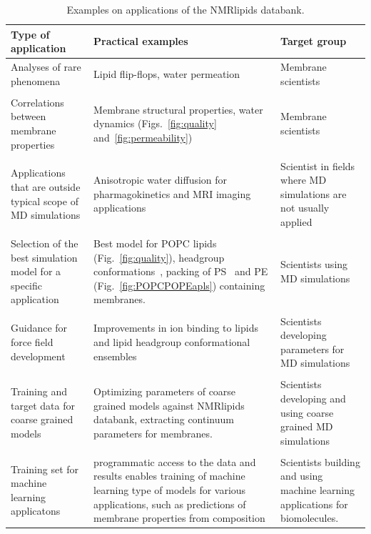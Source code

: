 \documentclass[fleqn,10pt]{wlscirep}
\begin{document}
\begin{table}[t]
    \centering
    \begin{tabular}{p{5.0cm}  p{5.0cm}  p{4.0cm}}
    Type of application     & Practical examples & Target group \\
    \hline
    Analyses of rare phenomena               & Lipid flip-flops, water permeation & Membrane scientists \\
    \\
    Correlations between membrane properties & 
    Membrane structural properties, water dynamics (Figs.~\ref{fig:quality} and~\ref{fig:permeability}) & 
    Membrane scientists \\
    \\
    Applications that are outside typical scope of MD simulations & 
    Anisotropic water diffusion for pharmagokinetics and MRI imaging applications & 
    Scientist in fields where MD simulations are not usually applied \\
    \\
    Selection of the best simulation model for a specific application & 
    Best model for POPC lipids (Fig.~\ref{fig:quality}), headgroup conformations~\cite{bacle21}, 
    packing of PS~\cite{antila22b} and PE (Fig.~\ref{fig:POPCPOPEapls}) containing membranes. &
    Scientists using MD simulations \\
    \\
    Guidance for force field development & 
    Improvements in ion binding to lipids~\cite{melcr18,melcr20} and lipid headgroup conformational ensembles~\cite{yu21,dickson22,grote20} &
    Scientists developing parameters for MD simulations \\
    \\
    Training and target data for coarse grained models & 
    Optimizing parameters of coarse grained models against NMRlipids databank, extracting continuum parameters for membranes. &
    Scientists developing and using coarse grained MD simulations \\
    \\
    Training set for machine learning applicatons &
    programmatic access to the data and results enables training of machine learning type of models for various applications, such as predictions of membrane properties from composition & Scientists building and using machine learning applications for biomolecules.  
    \end{tabular}
    \caption{Examples on applications of the NMRlipids databank.}
    \label{tab:applications}
\end{table}
\end{document}

